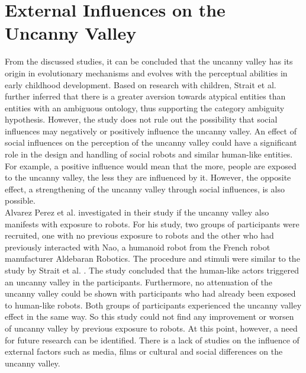 \section{External Influences on the Uncanny Valley}
From the discussed studies, it can be concluded that the uncanny valley has its origin in evolutionary mechanisms and evolves with the perceptual abilities in early childhood development. Based on research with children, Strait et al. \cite{childrens_responding} further inferred that there is a greater aversion towards atypical entities than entities with an ambiguous ontology, thus supporting the category ambiguity hypothesis. However, the study does not rule out the possibility that social influences may negatively or positively influence the uncanny valley. An effect of social influences on the perception of the uncanny valley could have a significant role in the design and handling of social robots and similar human-like entities. For example, a positive influence would mean that the more, people are exposed to the uncanny valley, the less they are influenced by it. However, the opposite effect, a strengthening of the uncanny valley through social influences, is also possible.\\
Alvarez Perez et al. \cite{prior_exposure_robots} investigated in their study if the uncanny valley also manifests with exposure to robots. For his study, two groups of participants were recruited, one with no previous exposure to robots and the other who had previously interacted with Nao, a humanoid robot from the French robot manufacturer Aldebaran Robotics. The procedure and stimuli were similar to the study by Strait et al. . The study concluded that the human-like actors triggered an uncanny valley in the participants. Furthermore, no attenuation of the uncanny valley could be shown with participants who had already been exposed to human-like robots. Both groups of participants experienced the uncanny valley effect in the same way. So this study could not find any improvement or worsen of uncanny valley by previous exposure to robots. At this point, however, a need for future research can be identified. There is a lack of studies on the influence of external factors such as media, films or cultural and social differences on the uncanny valley.  




